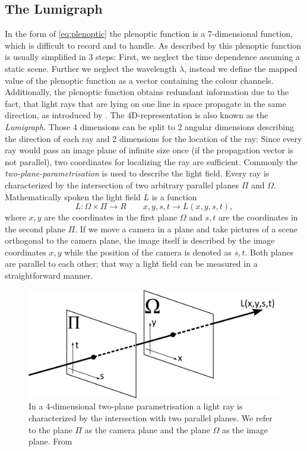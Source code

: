\documentclass  [
  paper    = a4,
  BCOR     = 10mm,
  twoside,
  fontsize = 12pt,
  fleqn,
  toc      = bibnumbered,
  toc      = listofnumbered,
  numbers  = noendperiod,
  headings = normal,
  listof   = leveldown,
  version  = 3.03
]                                       {scrreprt}
\begin{document}
\subsection{The Lumigraph}
In the form of \ref{eq:plenoptic} the plenoptic function is a 7-dimensional function, which is difficult to record and to handle. As described by \cite{wu2017light} this plenoptic function is usually simplified in 3 steps: First, we neglect the time dependence assuming a static scene. Further we neglect the wavelength $\lambda$, instead we define the mapped value of the plenoptic function as a vector containing the colour channels. 
Additionally, the plenoptic function obtains redundant information due to the fact, that light rays that are lying on one line in space propagate in the same direction, as introduced by \cite{bolles1987epipolar}. The 4D-representation is also known as the \textit{Lumigraph}. Those 4 dimensions can be split to 2 angular dimensions describing the direction of each ray and 2 dimensions for the location of the ray: Since every ray would pass an image plane of infinite size once (if the propagation vector is not parallel), two coordinates for localizing the ray are sufficient. Commonly the \textit{two-plane-parametrisation} is used to describe the light field. Every ray is characterized by the intersection of two arbitrary parallel planes $\Pi$ and $\Omega$. Mathematically spoken the light field $L$ is a function
\begin{equation}\label{key}
L:\Omega\times \Pi \rightarrow \!R\qquad x,y,s,t\rightarrow L(x,y,s,t),
\end{equation}
where $x,y$ are the coordinates in the first plane $\Omega$ and $s,t$ are the coordinates in the second plane $\Pi$. If we move a camera in a plane and take pictures of a scene orthogonal to the camera plane, the image itself is described by the image coordinates $x,y$ while the position of the camera is denoted as $s,t$. Both planes are parallel to each other; that way a light field can be measured in a straightforward manner.
\begin{figure}[h]
	\centering
	\includegraphics[width=0.7\linewidth]{images/twoplane_param}
	\caption[Two-plane parametrisation]{In a 4-dimensional two-plane parametrisation a light ray is characterized by the intersection with two parallel planes. We refer to the plane  $\Pi$ as the camera plane and the plane $\Omega$ as the image plane. From \cite{Xu:12}}
	\label{fig:twoplaneparam}
\end{figure}
\end{document}
